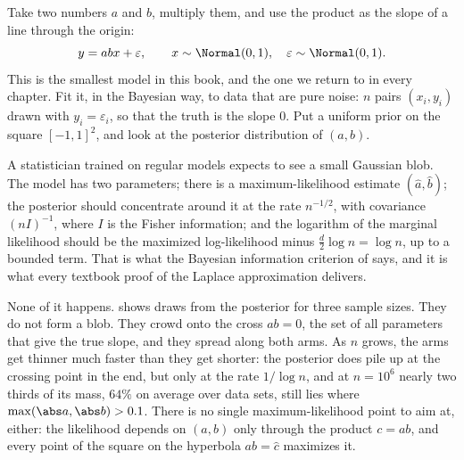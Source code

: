 \begin{refsection}

Take two numbers $a$ and $b$, multiply them, and use the product as the slope of a line through the origin:
\[
y=abx+\varepsilon,\qquad x\sim\Normal(0,1),\quad\varepsilon\sim\Normal(0,1).
\]
This is the smallest model in this book, and the one we return to in every chapter. Fit it, in the Bayesian way, to data that are pure noise: $n$ pairs $(x_i,y_i)$ drawn with $y_i=\varepsilon_i$, so that the truth is the slope $0$. Put a uniform prior on the square $[-1,1]^2$, and look at the posterior distribution of $(a,b)$.

A statistician trained on regular models expects to see a small Gaussian blob. The model has two parameters; there is a maximum-likelihood estimate $(\hat a,\hat b)$; the posterior should concentrate around it at the rate $n^{-1/2}$, with covariance $(nI)^{-1}$, where $I$ is the Fisher information; and the logarithm of the marginal likelihood should be the maximized log-likelihood minus $\tfrac d2\log n=\log n$, up to a bounded term. That is what the Bayesian information criterion of \textcite{Schwarz1978} says, and it is what every textbook proof of the Laplace approximation delivers.

None of it happens.  shows draws from the posterior for three sample sizes. They do not form a blob. They crowd onto the cross $ab=0$, the set of all parameters that give the true slope, and they spread along both arms. As $n$ grows, the arms get thinner much faster than they get shorter: the posterior does pile up at the crossing point in the end, but only at the rate $1/\log n$, and at $n=10^6$ nearly two thirds of its mass, $64\%$ on average over data sets, still lies where $\max(\abs a,\abs b)>0.1$. There is no single maximum-likelihood point to aim at, either: the likelihood depends on $(a,b)$ only through the product $c=ab$, and every point of the square on the hyperbola $ab=\hat c$ maximizes it.


\end{refsection}
